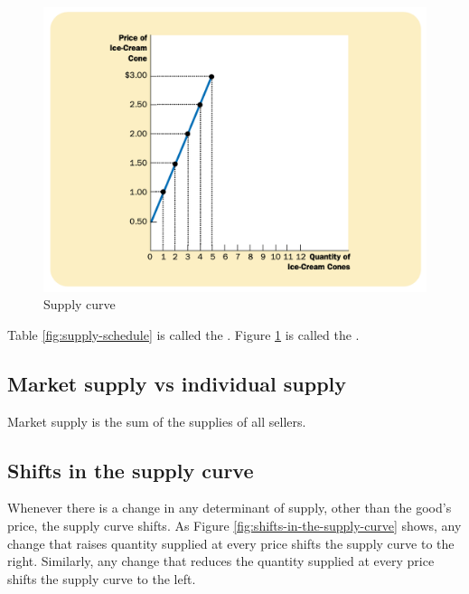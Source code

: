\begin{figure}[!ht]
  \centering
  \includegraphics[width=\textwidth]{pics/supply-curve}
  \caption{Supply curve}
  \label{fig:supply-curve}
\end{figure}

Table \ref{fig:supply-schedule} is called the .
Figure  \ref{fig:supply-curve} is called the .


\subsection{Market supply vs individual supply}

Market supply is the sum of the supplies of all sellers.


\subsection{Shifts in the supply curve}

Whenever there is a change in any determinant of supply, other than the good’s price, the supply curve shifts.
As Figure \ref{fig:shifts-in-the-supply-curve} shows, any change that raises quantity supplied at every price shifts the supply curve to the right.
Similarly, any change that reduces the quantity supplied at every price shifts the supply curve to the left.


